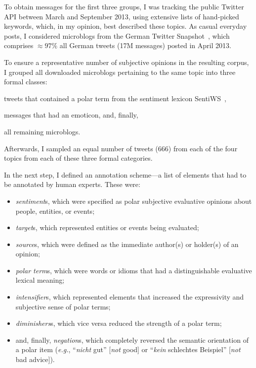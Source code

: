 \documentclass[11pt]{article}
\newcommand{\eg}{\textit{e.g.},}
\renewcommand{\cite}{\citep}
\begin{document}
To obtain messages for the first three groups, I was tracking the
public Twitter API between March and September 2013, using extensive
lists of hand-picked keywords, which, in my opinion, best described
these topics.  As casual everyday posts, I considered microblogs from
the German Twitter Snapshot~\cite{Scheffler:14}, which comprises
$\approx97\%$ all German tweets (17M messages) posted in April 2013.

To ensure a representative number of subjective opinions in the
resulting corpus, I grouped all downloaded microblogs pertaining to
the same topic into three formal classes:
\begin{inparaenum}[(i)]
  \item tweets that contained a polar term from the sentiment lexicon
    SentiWS~\cite{Remus:10},
  \item messages that had an emoticon, and, finally,
  \item all remaining microblogs.
\end{inparaenum}
Afterwards, I sampled an equal number of tweets (666) from each of the
four topics from each of these three formal categories.

In the next step, I defined an annotation scheme---a list of elements
that had to be annotated by human experts.  These were:
\begin{itemize}
  \item\emph{sentiment}s, which were specified as polar subjective
    evaluative opinions about people, entities, or events;

  \item\emph{target}s, which represented entities or events being
    evaluated;

  \item\emph{source}s, which were defined as the immediate author(s)
    or holder(s) of an opinion;

  \item\emph{polar term}s, which were words or idioms that had a
    distinguishable evaluative lexical meaning;

  \item\emph{intensifier}s, which represented elements that increased
    the expressivity and subjective sense of polar terms;

  \item\emph{diminishers}s, which vice versa reduced the strength of a
    polar term;

  \item and, finally, \emph{negation}s, which completely reversed the
    semantic orientation of a polar item (\eg{} ``\emph{nicht} gut''
    [\emph{not} good] or ``\emph{kein} schlechtes Beispiel''
    [\emph{not} bad advice]).
\end{itemize}
\end{document}
